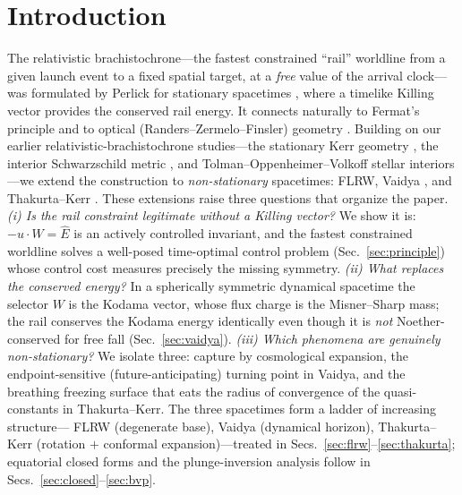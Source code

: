 \documentclass[12pt]{iopart}
\newcommand{\Ehat}{\hat E}
\begin{document}
\maketitle

\makeatletter
\renewcommand{\numberline}[1]{#1\enspace}
\makeatother
{\hypersetup{linkcolor=black}\tableofcontents}


\section{Introduction}
\label{sec:intro}
The relativistic brachistochrone---the fastest constrained ``rail'' worldline from a
given launch event to a fixed spatial target, at a \emph{free} value of the arrival
clock---was formulated by Perlick for stationary spacetimes
\cite{Perlick1991,PerlickRayOptics}, where a timelike Killing vector provides
the conserved rail energy. It connects naturally to Fermat's principle and to
optical (Randers--Zermelo--Finsler) geometry
\cite{Kovner1990,Randers1941,GibbonsWerner2008,GibbonsRanders2009,BaoRoblesShen}.
Building on our earlier relativistic-brachistochrone studies---the stationary
Kerr geometry \cite{RosignoliKerr}, the interior Schwarzschild metric
\cite{RosignoliIntSchw}, and Tolman--Oppenheimer--Volkoff stellar interiors
\cite{RosignoliTOV}---we extend the construction to \emph{non-stationary}
spacetimes: FLRW, Vaidya \cite{Vaidya1951}, and Thakurta--Kerr
\cite{Thakurta1981}.
These extensions raise three questions that organize the paper.
\emph{(i) Is the rail constraint legitimate without a Killing vector?} We show it
is: $-u\cdot W=\Ehat$ is an actively controlled invariant, and the fastest
constrained worldline solves a well-posed time-optimal control problem
(Sec.~\ref{sec:principle}) whose control cost measures precisely the missing
symmetry. \emph{(ii) What replaces the conserved energy?} In a spherically
symmetric dynamical spacetime the selector $W$ is the Kodama vector, whose flux
charge is the Misner--Sharp mass; the rail conserves the Kodama energy
identically even though it is \emph{not} Noether-conserved for free fall
(Sec.~\ref{sec:vaidya}). \emph{(iii) Which phenomena are genuinely
non-stationary?} We isolate three: capture by cosmological expansion, the
endpoint-sensitive (future-anticipating) turning point in Vaidya, and the breathing
freezing surface that eats the radius of convergence of the quasi-constants in
Thakurta--Kerr. The three spacetimes form a ladder of increasing structure---%
FLRW (degenerate base), Vaidya (dynamical horizon), Thakurta--Kerr
(rotation $+$ conformal expansion)---treated in
Secs.~\ref{sec:flrw}--\ref{sec:thakurta}; equatorial closed forms and the
plunge-inversion analysis follow in Secs.~\ref{sec:closed}--\ref{sec:bvp}.
\end{document}
